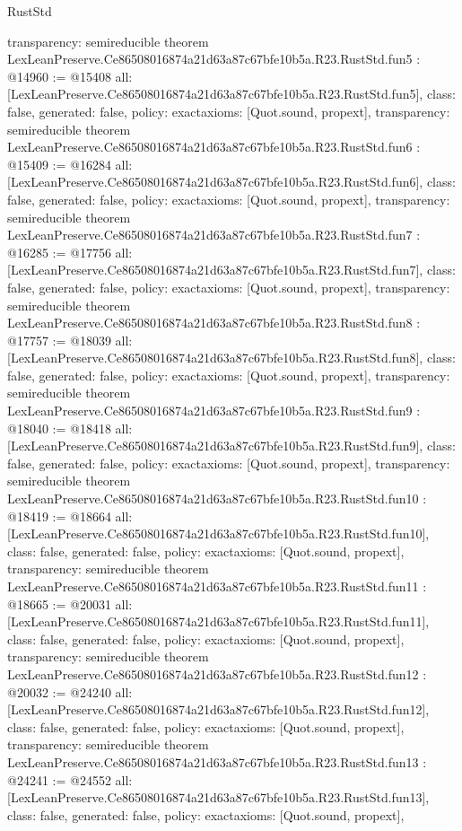 \begin{lexlean}{RustStd}
\begin{coremodule}
{  transparency: semireducible
}
theorem LexLeanPreserve.Ce86508016874a21d63a87c67bfe10b5a.R23.RustStd.fun5 : @14960 := @15408 {
  all: [LexLeanPreserve.Ce86508016874a21d63a87c67bfe10b5a.R23.RustStd.fun5],
  class: false,
  generated: false,
  policy: exact{axioms: [Quot.sound, propext]},
  transparency: semireducible
}
theorem LexLeanPreserve.Ce86508016874a21d63a87c67bfe10b5a.R23.RustStd.fun6 : @15409 := @16284 {
  all: [LexLeanPreserve.Ce86508016874a21d63a87c67bfe10b5a.R23.RustStd.fun6],
  class: false,
  generated: false,
  policy: exact{axioms: [Quot.sound, propext]},
  transparency: semireducible
}
theorem LexLeanPreserve.Ce86508016874a21d63a87c67bfe10b5a.R23.RustStd.fun7 : @16285 := @17756 {
  all: [LexLeanPreserve.Ce86508016874a21d63a87c67bfe10b5a.R23.RustStd.fun7],
  class: false,
  generated: false,
  policy: exact{axioms: [Quot.sound, propext]},
  transparency: semireducible
}
theorem LexLeanPreserve.Ce86508016874a21d63a87c67bfe10b5a.R23.RustStd.fun8 : @17757 := @18039 {
  all: [LexLeanPreserve.Ce86508016874a21d63a87c67bfe10b5a.R23.RustStd.fun8],
  class: false,
  generated: false,
  policy: exact{axioms: [Quot.sound, propext]},
  transparency: semireducible
}
theorem LexLeanPreserve.Ce86508016874a21d63a87c67bfe10b5a.R23.RustStd.fun9 : @18040 := @18418 {
  all: [LexLeanPreserve.Ce86508016874a21d63a87c67bfe10b5a.R23.RustStd.fun9],
  class: false,
  generated: false,
  policy: exact{axioms: [Quot.sound, propext]},
  transparency: semireducible
}
theorem LexLeanPreserve.Ce86508016874a21d63a87c67bfe10b5a.R23.RustStd.fun10 : @18419 := @18664 {
  all: [LexLeanPreserve.Ce86508016874a21d63a87c67bfe10b5a.R23.RustStd.fun10],
  class: false,
  generated: false,
  policy: exact{axioms: [Quot.sound, propext]},
  transparency: semireducible
}
theorem LexLeanPreserve.Ce86508016874a21d63a87c67bfe10b5a.R23.RustStd.fun11 : @18665 := @20031 {
  all: [LexLeanPreserve.Ce86508016874a21d63a87c67bfe10b5a.R23.RustStd.fun11],
  class: false,
  generated: false,
  policy: exact{axioms: [Quot.sound, propext]},
  transparency: semireducible
}
theorem LexLeanPreserve.Ce86508016874a21d63a87c67bfe10b5a.R23.RustStd.fun12 : @20032 := @24240 {
  all: [LexLeanPreserve.Ce86508016874a21d63a87c67bfe10b5a.R23.RustStd.fun12],
  class: false,
  generated: false,
  policy: exact{axioms: [Quot.sound, propext]},
  transparency: semireducible
}
theorem LexLeanPreserve.Ce86508016874a21d63a87c67bfe10b5a.R23.RustStd.fun13 : @24241 := @24552 {
  all: [LexLeanPreserve.Ce86508016874a21d63a87c67bfe10b5a.R23.RustStd.fun13],
  class: false,
  generated: false,
  policy: exact{axioms: [Quot.sound, propext]},
}
\end{coremodule}
\end{lexlean}
